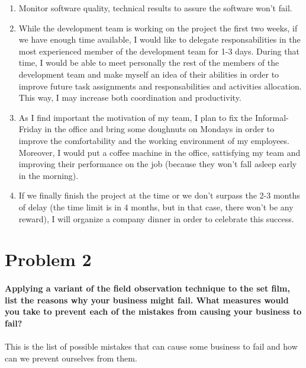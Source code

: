 \documentclass{article}
\begin{document}
\begin{enumerate}
\item Monitor software quality, technical results to assure the software won't fail.

\item While the development team is working on the project the first two weeks, if we have enough time available, I would like to delegate responsabilities in the most experienced member of the development team for 1-3 days. During that time, I would be able to meet personally the rest of the members of the development team and make myself an idea of their abilities in order to improve future task assignments and responsabilities and activities allocation. This way, I may increase both coordination and productivity.

\item As I find important the motivation of my team, I plan to fix the Informal-Friday in the office and bring some doughnuts on Mondays in order to improve the comfortability and the working environment of my employees. Moreover, I would put a coffee machine in the office, sattisfying my team and improving their performance on the job (because they won't fall asleep early in the morning).

\item If we finally finish the project at the time or we don't surpass the 2-3 months of delay (the time limit is in 4 months, but in that case, there won't be any reward), I will organize a company dinner in order to celebrate this success.

\end{enumerate}

\newpage
\section{Problem 2}

\paragraph{Applying a variant of the field observation technique to the set film, list the reasons why your business might fail. What measures would you take to prevent each of the mistakes from causing your business to fail?}
\paragraph{}

This is the list of possible mistakes that can cause some business to fail and how can we prevent ourselves from them.
\end{document}
